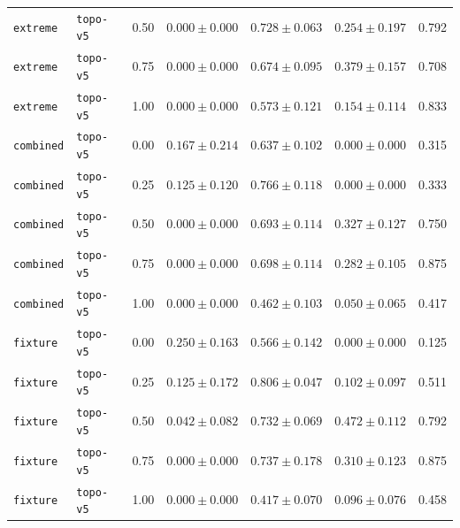 \documentclass{article}
\begin{document}
\begin{center}
\begin{tabular}{lllcccc}
\texttt{extreme} & \texttt{topo-v5} & 0.50 & $0.000 \pm 0.000$ & $0.728 \pm 0.063$ & $0.254 \pm 0.197$ & 0.792 \\
\texttt{extreme} & \texttt{topo-v5} & 0.75 & $0.000 \pm 0.000$ & $0.674 \pm 0.095$ & $0.379 \pm 0.157$ & 0.708 \\
\texttt{extreme} & \texttt{topo-v5} & 1.00 & $0.000 \pm 0.000$ & $0.573 \pm 0.121$ & $0.154 \pm 0.114$ & 0.833 \\
\texttt{combined} & \texttt{topo-v5} & 0.00 & $0.167 \pm 0.214$ & $0.637 \pm 0.102$ & $0.000 \pm 0.000$ & 0.315 \\
\texttt{combined} & \texttt{topo-v5} & 0.25 & $0.125 \pm 0.120$ & $0.766 \pm 0.118$ & $0.000 \pm 0.000$ & 0.333 \\
\texttt{combined} & \texttt{topo-v5} & 0.50 & $0.000 \pm 0.000$ & $0.693 \pm 0.114$ & $0.327 \pm 0.127$ & 0.750 \\
\texttt{combined} & \texttt{topo-v5} & 0.75 & $0.000 \pm 0.000$ & $0.698 \pm 0.114$ & $0.282 \pm 0.105$ & 0.875 \\
\texttt{combined} & \texttt{topo-v5} & 1.00 & $0.000 \pm 0.000$ & $0.462 \pm 0.103$ & $0.050 \pm 0.065$ & 0.417 \\
\texttt{fixture} & \texttt{topo-v5} & 0.00 & $0.250 \pm 0.163$ & $0.566 \pm 0.142$ & $0.000 \pm 0.000$ & 0.125 \\
\texttt{fixture} & \texttt{topo-v5} & 0.25 & $0.125 \pm 0.172$ & $0.806 \pm 0.047$ & $0.102 \pm 0.097$ & 0.511 \\
\texttt{fixture} & \texttt{topo-v5} & 0.50 & $0.042 \pm 0.082$ & $0.732 \pm 0.069$ & $0.472 \pm 0.112$ & 0.792 \\
\texttt{fixture} & \texttt{topo-v5} & 0.75 & $0.000 \pm 0.000$ & $0.737 \pm 0.178$ & $0.310 \pm 0.123$ & 0.875 \\
\texttt{fixture} & \texttt{topo-v5} & 1.00 & $0.000 \pm 0.000$ & $0.417 \pm 0.070$ & $0.096 \pm 0.076$ & 0.458 \\
\bottomrule
\end{tabular}
\end{center}
\normalsize
\end{document}
